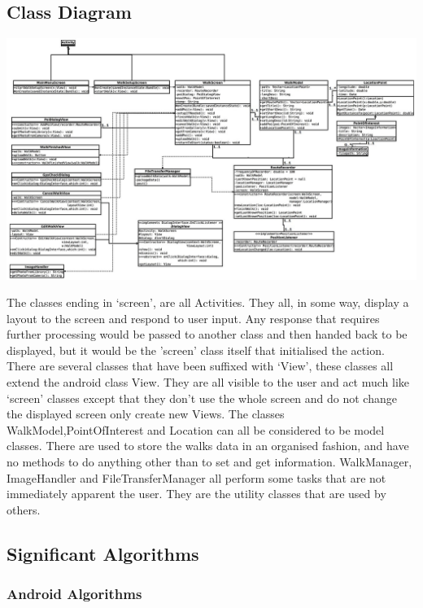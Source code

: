 \documentclass[12pt]{article}
\begin{document}
\subsection{Class Diagram}
\begin{landscape}
\begin{adjustwidth}{0.5cm}{2cm}
\includegraphics[scale=2.74253]{Design/class_diagram_new.jpg}

\end{adjustwidth}
\end{landscape}
\restoregeometry
The classes ending in ‘screen’, are all Activities. They all, in some way, display a layout to the screen and respond to user input. Any response that requires further processing would be passed to another class and then handed back to be displayed, but it would be the ’screen’ class itself that initialised the action.  
There are several classes that have been suffixed with ‘View’, these classes all extend the android class View. They are all visible to the user and act much like ‘screen’ classes except that they don’t use the whole screen and do not change the displayed screen only create new Views.  
The classes WalkModel,PointOfInterest and Location can all be considered to be model classes. There are used to store the walks data in an organised fashion, and have no methods to do anything other than to set and get information.  
WalkManager, ImageHandler and FileTransferManager all perform some tasks that are not immediately apparent the user. They are the utility classes that are used by others.
\subsection{Significant Algorithms}
\subsubsection{Android Algorithms}
\end{document}

